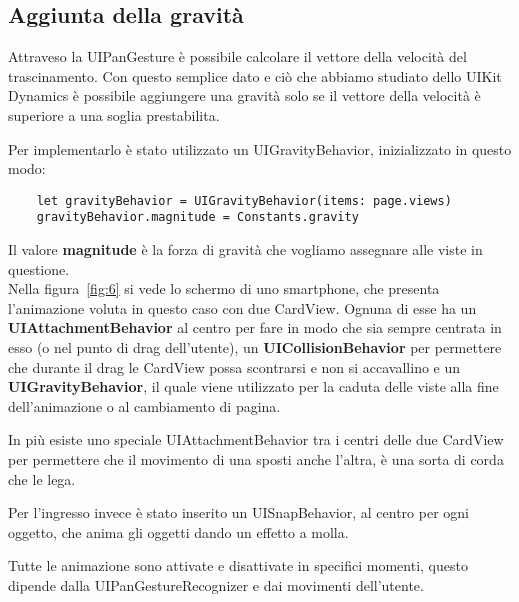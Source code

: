 \subsection{Aggiunta della gravità }

Attraveso la UIPanGesture è possibile calcolare il vettore della velocità del trascinamento.
Con questo semplice dato e ciò che abbiamo studiato dello UIKit Dynamics è possibile aggiungere una gravità solo se
il vettore della velocità è superiore a una soglia prestabilita.

Per implementarlo è stato utilizzato un UIGravityBehavior, inizializzato in questo modo:

\begin{verbatim}
    let gravityBehavior = UIGravityBehavior(items: page.views)
    gravityBehavior.magnitude = Constants.gravity
\end{verbatim}

Il valore \textbf{magnitude} è la forza di gravità che vogliamo
assegnare alle viste in questione. \\

Nella figura~\ref{fig:6} si vede lo schermo di uno smartphone, che presenta l'animazione
voluta in questo caso con due CardView. Ognuna di esse ha un \textbf{UIAttachmentBehavior} al
centro per fare in modo che sia sempre centrata in esso (o nel punto di drag dell'utente),
un \textbf{UICollisionBehavior} per permettere che durante il drag le CardView possa scontrarsi e non si accavallino e un \textbf{UIGravityBehavior}, il quale 
viene utilizzato per la caduta delle viste alla fine dell'animazione o al cambiamento di pagina.

In più esiste uno speciale UIAttachmentBehavior tra i centri delle due CardView per permettere che il movimento di una
sposti anche l'altra, è una sorta di corda che le lega.

Per l'ingresso invece è stato inserito un UISnapBehavior, al centro per ogni oggetto, che anima 
gli oggetti dando un effetto a molla.

Tutte le animazione sono attivate e disattivate in specifici momenti, questo dipende 
dalla UIPanGestureRecognizer e dai movimenti dell'utente.

